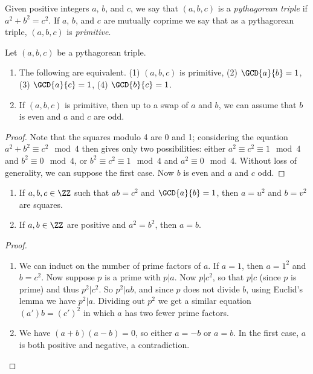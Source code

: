 \documentclass{article}
\begin{document}

\begin{dfn}
Given positive integers $a$, $b$, and $c$, we say that $(a,b,c)$ is a \emph{pythagorean triple} if $a^2 + b^2 = c^2$. If $a$, $b$, and $c$ are mutually coprime we say that as a pythagorean triple, $(a,b,c)$ is \emph{primitive}.
\end{dfn}

\begin{prop}
Let $(a,b,c)$ be a pythagorean triple.
\begin{enumerate}
\item The following are equivalent. (1) $(a,b,c)$ is primitive, (2) $\GCD{a}{b} = 1$, (3) $\GCD{a}{c} = 1$, (4) $\GCD{b}{c} = 1$.
\item If $(a,b,c)$ is primitive, then up to a swap of $a$ and $b$, we can assume that $b$ is even and $a$ and $c$ are odd.
\end{enumerate}
\end{prop}

\begin{proof}
Note that the squares modulo 4 are 0 and 1; considering the equation $a^2 + b^2 \equiv c^2 \mod 4$ then gives only two possibilities: either $a^2 \equiv c^2 \equiv 1 \mod 4$ and $b^2 \equiv 0 \mod 4$, or $b^2 \equiv c^2 \equiv 1 \mod 4$ and $a^2 \equiv 0 \mod 4$. Without loss of generality, we can suppose the first case. Now $b$ is even and $a$ and $c$ odd.
\end{proof}

\begin{lem} \mbox{}
\begin{enumerate}
\item If $a,b,c \in \ZZ$ such that $ab = c^2$ and $\GCD{a}{b} = 1$, then $a = u^2$ and $b = v^2$ are squares.
\item If $a,b \in \ZZ$ are positive and $a^2 = b^2$, then $a = b$.
\end{enumerate}
\end{lem}

\begin{proof} \mbox{}
\begin{enumerate}
\item We can induct on the number of prime factors of $a$. If $a = 1$, then $a = 1^2$ and $b = c^2$. Now suppose $p$ is a prime with $p|a$. Now $p|c^2$, so that $p|c$ (since $p$ is prime) and thus $p^2|c^2$. So $p^2|ab$, and since $p$ does not divide $b$, using Euclid's lemma we have $p^2|a$. Dividing out $p^2$ we get a similar equation $(a')b = (c')^2$ in which $a$ has two fewer prime factors.
\item We have $(a+b)(a-b) = 0$, so either $a = -b$ or $a = b$. In the first case, $a$ is both positive and negative, a contradiction. \qedhere
\end{enumerate}
\end{proof}
\end{document}
